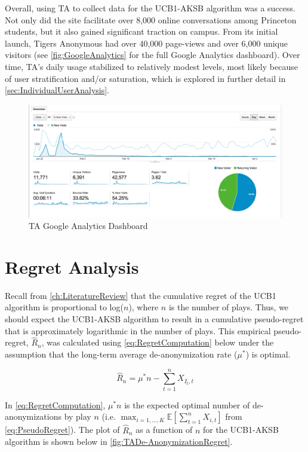 Overall, using TA to collect data for the UCB1-AKSB algorithm was a success. Not only did the site facilitate over 8,000 online conversations among Princeton students, but it also gained significant traction on campus. From its initial launch, Tigers Anonymous had over 40,000 page-views and over 6,000 unique visitors (see \autoref{fig:GoogleAnalytics} for the full Google Analytics dashboard). Over time, TA's daily usage stabilized to relatively modest levels, most likely because of user stratification and/or saturation, which is explored in further detail in \autoref{sec:IndividualUserAnalysis}.

\begin{figure}[H]
\centering
\includegraphics[trim= 0mm 0mm 0mm 0mm, clip, scale=0.3]{./Figures/GoogleAnalytics}
\caption{TA Google Analytics Dashboard}
\label{fig:GoogleAnalytics}
\end{figure}

\section{Regret Analysis}
\label{sec:RegretAnalysis}

Recall from \autoref{ch:LiteratureReview} that the cumulative regret of the UCB1 algorithm is proportional to log($n$), where $n$ is the number of plays. Thus, we should expect the UCB1-AKSB algorithm to result in a cumulative pseudo-regret that is approximately logarithmic in the number of plays. This empirical pseudo-regret, $\hat{R}_n$, was calculated using \autoref{eq:RegretComputation} below under the assumption that the long-term average de-anonymization rate ($\mu^{*}$) is optimal.

\begin{equation}
\label{eq:RegretComputation}
\hat{R}_n = \mu^{*}n - \sum_{t=1}^{n}{X_{I_t, t}}
\end{equation}

In \autoref{eq:RegretComputation}, $\mu^{*}n$ is the expected optimal number of de-anonymizations by play $n$ (i.e. $\max_{i=1,...,K}{\mathbb{E}\left[\sum_{t=1}^{n}{X_{i, t}}\right]}$ from \autoref{eq:PseudoRegret}). The plot of $\hat{R}_n$ as a function of $n$ for the UCB1-AKSB algorithm is shown below in \autoref{fig:TADe-AnonymizationRegret}.

